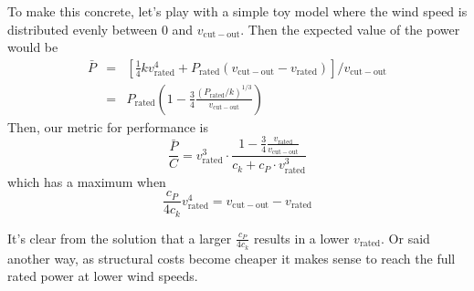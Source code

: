 \documentclass[11pt]{amsart}
\begin{document}
To make this concrete, let's play with a simple toy model where the
wind speed is distributed evenly between 0 and $v_{\mathrm{cut-out}}$.
Then the expected value of the power would be
\begin{eqnarray}
\bar{P} &=& \left[ \frac{1}{4} k v_{\mathrm{rated}}^4
  + P_{\mathrm{rated}} (v_{\mathrm{cut-out}} - v_{\mathrm{rated}}) \right]
  \Big/ v_{\mathrm{cut-out}} \\
       &=& P_{\mathrm{rated}} \left(1 - \frac{3}{4}
  \frac{(P_{\mathrm{rated}}/k)^{1/3}}{v_{\mathrm{cut-out}}} \right)
\end{eqnarray}
Then, our metric for performance is
\begin{equation}
\frac{\bar{P}}{C} = v_{\mathrm{rated}}^3 \cdot
\frac{1 - \frac{3}{4}\frac{v_{\mathrm{rated}}}{v_{\mathrm{cut-out}}}}{c_k + c_P \cdot v_{\mathrm{rated}}^3}
\end{equation}
which has a maximum when
\begin{equation}
\frac{c_P}{4 c_k} v_{\mathrm{rated}}^4 = v_{\mathrm{cut-out}} - v_{\mathrm{rated}}
\end{equation}
\begin{center}
\end{center}
It's clear from the solution that a larger $\frac{c_P}{4c_k}$ results
in a lower $v_{\mathrm{rated}}$.  Or said another way, as structural
costs become cheaper it makes sense to reach the full rated power at
lower wind speeds.
\end{document}
